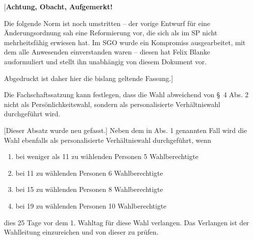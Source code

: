 \documentclass[%
draft,%
multilinesections%
]{fswo}
\newcommand\bemFr[1] {{\color{Red}[#1]}}
\newcommand\bemFe[1] {{\color{Cyan}[#1]}}
\newcommand\bemFr[1]{}%
\newcommand\bemFe[1]{}%
\begin{document}
\bemFr{\textbf{Achtung, Obacht, Aufgemerkt!}

Die folgende Norm ist noch umstritten – der vorige Entwurf für eine Änderungsordnung sah eine Reformierung vor, die sich als im SP nicht mehrheitsfähig erwiesen hat.
Im SGO wurde ein Kompromiss ausgearbeitet, mit dem alle Anwesenden einverstanden waren – diesen hat Felix Blanke ausformuliert und stellt ihn unabhängig von diesem Dokument vor.

Abgedruckt ist daher hier die bislang geltende Fassung.}


\begin{contract}
Die Fachschaftssatzung kann festlegen, dass die Wahl abweichend von \S~4 Abs. 2 nicht als Persönlichkeitswahl, sondern als personalisierte Verhältniswahl durchgeführt wird.

\bemFe{Dieser Absatz wurde neu gefasst.}
\begingroup
\makeatletter
  \ifFK@draft\color{Green}\fi
\makeatother
Neben dem in Abs. 1 genannten Fall wird die Wahl ebenfalls als
personalisierte Verhältniswahl durchgeführt, wenn
\begin{enumerate}
\item bei weniger als 11 zu wählenden Personen 5 Wahlberechtigte
\item bei 11 zu wählenden Personen 6 Wahlberechtigte
\item bei 15 zu wählenden Personen 8 Wahlberechtigte
\item bei 19 zu wählenden Personen 10 Wahlberechtigte
\end{enumerate}
dies 25 Tage vor dem 1. Wahltag für diese Wahl verlangen. Das Verlangen ist der Wahlleitung einzureichen und von dieser zu prüfen.
\endgroup


\end{contract}
\end{document}
